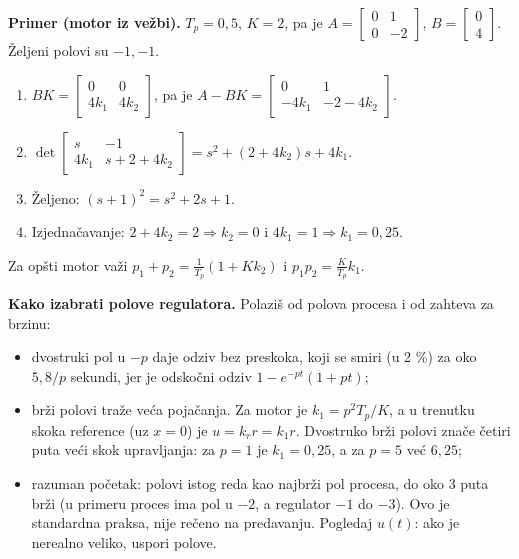 \documentclass[11pt,a4paper,parskip=half,headsepline,numbers=noenddot]{scrartcl}
\begin{document}
\textbf{Primer (motor iz vežbi).} \(T_p = 0{,}5\), \(K = 2\), pa je \(A = \begin{bmatrix}0 & 1\\ 0 & -2\end{bmatrix}\), \(B = \begin{bmatrix}0\\ 4\end{bmatrix}\). Željeni polovi su \(-1, -1\).

\begin{enumerate}
\def\labelenumi{\arabic{enumi}.}
\item \(BK = \begin{bmatrix}0 & 0\\ 4k_1 & 4k_2\end{bmatrix}\), pa je \(A - BK = \begin{bmatrix}0 & 1\\ -4k_1 & -2 - 4k_2\end{bmatrix}\).
\item \(\det\begin{bmatrix}s & -1\\ 4k_1 & s + 2 + 4k_2\end{bmatrix} = s^2 + (2 + 4k_2)s + 4k_1\).
\item Željeno: \((s+1)^2 = s^2 + 2s + 1\).
\item Izjednačavanje: \(2 + 4k_2 = 2 \Rightarrow k_2 = 0\) i \(4k_1 = 1 \Rightarrow k_1 = 0{,}25\).
\end{enumerate}

Za opšti motor važi \(p_1 + p_2 = \frac{1}{T_p}(1 + Kk_2)\) i \(p_1p_2 = \frac{K}{T_p}k_1\).

\textbf{Kako izabrati polove regulatora.} Polaziš od polova procesa i od zahteva za brzinu:

\begin{itemize}
\item dvostruki pol u \(-p\) daje odziv bez preskoka, koji se smiri (u 2 \%) za oko \(5{,}8/p\) sekundi, jer je odskočni odziv \(1 - e^{-pt}(1 + pt)\);
\item brži polovi traže veća pojačanja. Za motor je \(k_1 = p^2T_p/K\), a u trenutku skoka reference (uz \(x = 0\)) je \(u = k_rr = k_1r\). Dvostruko brži polovi znače četiri puta veći skok upravljanja: za \(p = 1\) je \(k_1 = 0{,}25\), a za \(p = 5\) već \(6{,}25\);
\item razuman početak: polovi istog reda kao najbrži pol procesa, do oko 3 puta brži (u primeru proces ima pol u \(-2\), a regulator \(-1\) do \(-3\)). Ovo je standardna praksa, nije rečeno na predavanju. Pogledaj \(u(t)\): ako je nerealno veliko, uspori polove.
\end{itemize}
\end{document}
